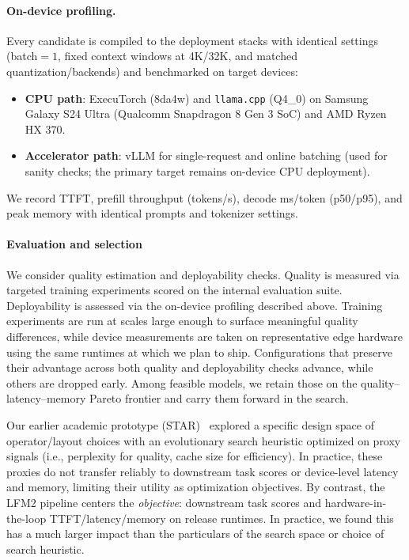\documentclass{article}
\begin{document}
\paragraph{On-device profiling.}
Every candidate is compiled to the deployment stacks with identical settings (batch$=1$, fixed context windows at 4K/32K, and matched quantization/backends) and benchmarked on target devices:
\begin{itemize}
  \item \textbf{CPU path}: ExecuTorch (8da4w) and \texttt{llama.cpp} (Q4\_0) on Samsung Galaxy S24 Ultra (Qualcomm Snapdragon 8 Gen 3 SoC) and AMD Ryzen HX 370.
  \item \textbf{Accelerator path}: vLLM for single-request and online batching (used for sanity checks; the primary target remains on-device CPU deployment).
\end{itemize}
We record TTFT, prefill throughput (tokens/s), decode ms/token (p50/p95), and peak memory with identical prompts and tokenizer settings.


\paragraph{Evaluation and selection}
We consider quality estimation and deployability checks. Quality is measured via targeted training experiments scored on the internal evaluation suite. Deployability is assessed via the on-device profiling described above. Training experiments are run at scales large enough to surface meaningful quality differences, while device measurements are taken on representative edge hardware using the same runtimes at which we plan to ship. Configurations that preserve their advantage across both quality and deployability checks advance, while others are dropped early. Among feasible models, we retain those on the quality–latency–memory Pareto frontier and carry them forward in the search. 

Our earlier academic prototype (STAR)~\citep{thomasstar} explored a specific design space of operator/layout choices with an evolutionary search heuristic optimized on proxy signals (i.e., perplexity for quality, cache size for efficiency). In practice, these proxies do not transfer reliably to downstream task scores or device-level latency and memory, limiting their utility as optimization objectives.
By contrast, the LFM2 pipeline centers the \emph{objective}: downstream task scores and hardware-in-the-loop TTFT/latency/memory on release runtimes. In practice, we found this has a much larger impact than the particulars of the search space or choice of search heuristic.
\end{document}
